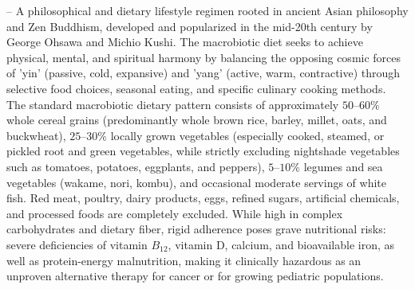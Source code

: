 -- A philosophical and dietary lifestyle regimen rooted in ancient Asian philosophy and Zen Buddhism, developed and popularized in the mid-20th century by George Ohsawa and Michio Kushi. The macrobiotic diet seeks to achieve physical, mental, and spiritual harmony by balancing the opposing cosmic forces of 'yin' (passive, cold, expansive) and 'yang' (active, warm, contractive) through selective food choices, seasonal eating, and specific culinary cooking methods. The standard macrobiotic dietary pattern consists of approximately $50\text{--}60\%$ whole cereal grains (predominantly whole brown rice, barley, millet, oats, and buckwheat), $25\text{--}30\%$ locally grown vegetables (especially cooked, steamed, or pickled root and green vegetables, while strictly excluding nightshade vegetables such as tomatoes, potatoes, eggplants, and peppers), $5\text{--}10\%$ legumes and sea vegetables (wakame, nori, kombu), and occasional moderate servings of white fish. Red meat, poultry, dairy products, eggs, refined sugars, artificial chemicals, and processed foods are completely excluded. While high in complex carbohydrates and dietary fiber, rigid adherence poses grave nutritional risks: severe deficiencies of vitamin $B_{12}$, vitamin D, calcium, and bioavailable iron, as well as protein-energy malnutrition, making it clinically hazardous as an unproven alternative therapy for cancer or for growing pediatric populations.

